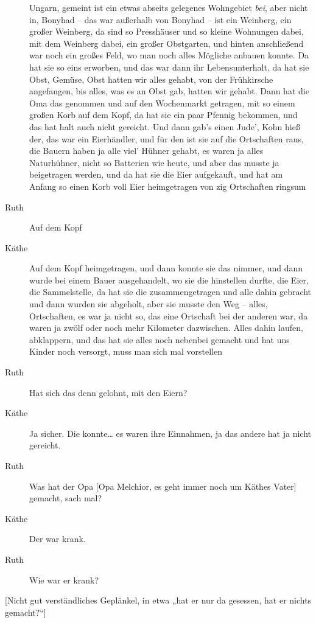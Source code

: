 \documentclass[ngerman,]{article}
\begin{document}
\begin{multicols}{2}
\begin{description}
{  Ungarn, gemeint ist ein etwas abseits gelegenes Wohngebiet \emph{bei},
  aber nicht in, Bonyhad} – das war außerhalb von Bonyhad – ist ein
Weinberg, ein großer Weinberg, da sind so Presshäuser und so kleine
Wohnungen dabei, mit dem Weinberg dabei, ein großer Obstgarten, und
hinten anschließend war noch ein großes Feld, wo man noch alles Mögliche
anbauen konnte. Da hat sie so eins erworben, und das war dann ihr
Lebensunterhalt, da hat sie Obst, Gemüse, Obst hatten wir alles gehabt,
von der Frühkirsche angefangen, bis alles, was es an Obst gab, hatten
wir gehabt. Dann hat die Oma das genommen und auf den Wochenmarkt
getragen, mit so einem großen Korb auf dem Kopf, da hat sie ein paar
Pfennig bekommen, und das hat halt auch nicht gereicht. Und dann gab's
einen Jude', Kohn hieß der, das war ein Eierhändler, und für den ist sie
auf die Ortschaften raus, die Bauern haben ja alle viel' Hühner gehabt,
es waren ja alles Naturhühner, nicht so Batterien wie heute, und aber
das musste ja beigetragen werden, und da hat sie die Eier aufgekauft,
und hat am Anfang so einen Korb voll Eier heimgetragen von zig
Ortschaften ringsum
\item[Ruth]
Auf dem Kopf
\item[Käthe]
Auf dem Kopf heimgetragen, und dann konnte sie das nimmer, und dann
wurde bei einem Bauer ausgehandelt, wo sie die hinstellen durfte, die
Eier, die Sammelstelle, da hat sie die zusammengetragen und alle dahin
gebracht und dann wurden sie abgeholt, aber sie musste den Weg – alles,
Ortschaften, es war ja nicht so, das eine Ortschaft bei der anderen war,
da waren ja zwölf oder noch mehr Kilometer dazwischen. Alles dahin
laufen, abklappern, und das hat sie alles noch nebenbei gemacht und hat
uns Kinder noch versorgt, muss man sich mal vorstellen
\item[Ruth]
Hat sich das denn gelohnt, mit den Eiern?
\item[Käthe]
Ja sicher. Die konnte\ldots{} es waren ihre Einnahmen, ja das andere hat
ja nicht gereicht.
\item[Ruth]
Was hat der Opa {[}Opa Melchior, es geht immer noch um Käthes Vater{]}
gemacht, sach mal?
\item[Käthe]
Der war krank.
\item[Ruth]
Wie war er krank?
\end{description}

{[}Nicht gut verständliches Geplänkel, in etwa „hat er nur da gesessen,
hat er nichts gemacht?“{]}


\end{multicols}
\end{document}

